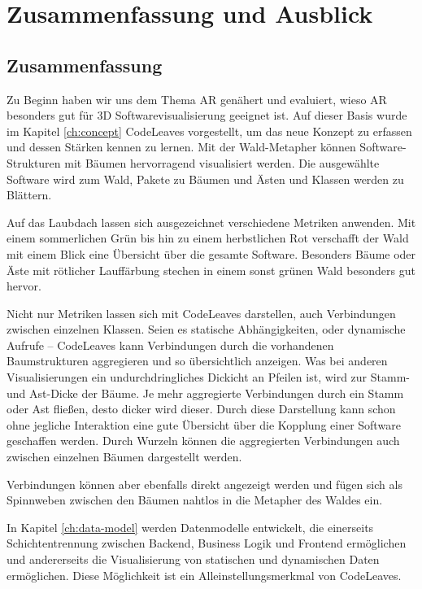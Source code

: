 \chapter{Zusammenfassung und Ausblick}
\label{ch:conclusion}

\section{Zusammenfassung}

Zu Beginn haben wir uns dem Thema AR genähert und evaluiert, wieso AR besonders gut für 3D Softwarevisualisierung geeignet ist. Auf dieser Basis wurde im Kapitel \ref{ch:concept} CodeLeaves vorgestellt, um das neue Konzept zu erfassen und dessen Stärken kennen zu lernen. Mit der Wald-Metapher können Software-Strukturen mit Bäumen hervorragend visualisiert werden. Die ausgewählte Software wird zum Wald, Pakete zu Bäumen und Ästen und Klassen werden zu Blättern.

Auf das Laubdach lassen sich ausgezeichnet verschiedene Metriken anwenden. Mit einem sommerlichen Grün bis hin zu einem herbstlichen Rot verschafft der Wald mit einem Blick eine Übersicht über die gesamte Software. Besonders Bäume oder Äste mit rötlicher Lauffärbung stechen in einem sonst grünen Wald besonders gut hervor.

Nicht nur Metriken lassen sich mit CodeLeaves darstellen, auch Verbindungen zwischen einzelnen Klassen. Seien es statische Abhängigkeiten, oder dynamische Aufrufe -- CodeLeaves kann Verbindungen durch die vorhandenen Baumstrukturen aggregieren und so übersichtlich anzeigen. Was bei anderen Visualisierungen ein undurchdringliches Dickicht an Pfeilen ist, wird zur Stamm- und Ast-Dicke der Bäume. Je mehr aggregierte Verbindungen durch ein Stamm oder Ast fließen, desto dicker wird dieser. Durch diese Darstellung kann schon ohne jegliche Interaktion eine gute Übersicht über die Kopplung einer Software geschaffen werden. Durch Wurzeln können die aggregierten Verbindungen auch zwischen einzelnen Bäumen dargestellt werden.

Verbindungen können aber ebenfalls direkt angezeigt werden und fügen sich als Spinnweben zwischen den Bäumen nahtlos in die Metapher des Waldes ein.

In Kapitel \ref{ch:data-model} werden Datenmodelle entwickelt, die einerseits Schichtentrennung zwischen Backend, Business Logik und Frontend ermöglichen und andererseits die Visualisierung von statischen und dynamischen Daten ermöglichen. Diese Möglichkeit ist ein Alleinstellungsmerkmal von CodeLeaves.

